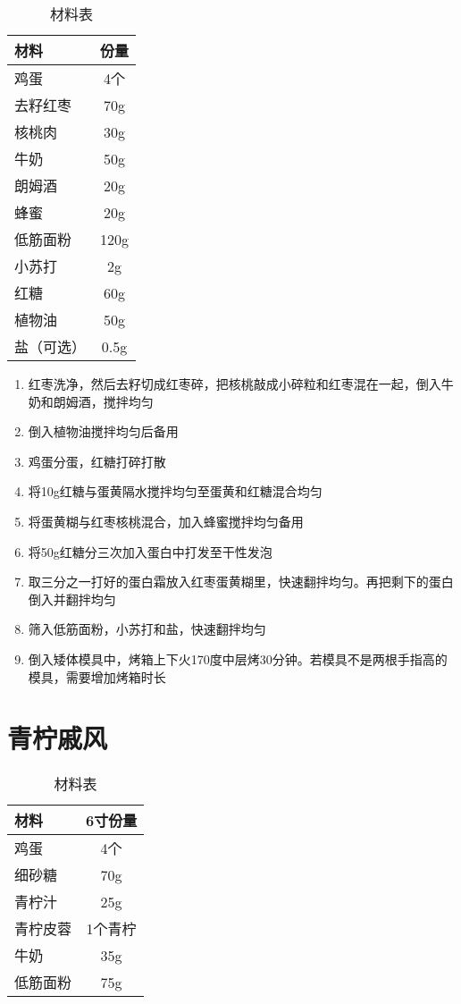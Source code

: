 \begin{table}[H]
    \centering
    \begin{tabular}{|l||c|}\hline
     \textbf{材料}    &  \textbf{份量}\\ \hline\hline
    鸡蛋 & 4个 \\ \hline
    去籽红枣 & 70g \\ \hline
    核桃肉 & 30g \\ \hline
    牛奶 & 50g \\ \hline
    朗姆酒 & 20g \\ \hline
    蜂蜜 & 20g \\ \hline
    低筋面粉 & 120g \\ \hline
    小苏打 & 2g \\ \hline
    红糖 & 60g \\ \hline
    植物油 & 50g \\ \hline
    盐（可选） & 0.5g \\ \hline
    \end{tabular}
    \caption{材料表}
\end{table}

\begin{enumerate}
    \item 红枣洗净，然后去籽切成红枣碎，把核桃敲成小碎粒和红枣混在一起，倒入牛奶和朗姆酒，搅拌均匀
    \item 倒入植物油搅拌均匀后备用
    \item 鸡蛋分蛋，红糖打碎打散
    \item 将10g红糖与蛋黄隔水搅拌均匀至蛋黄和红糖混合均匀
    \item 将蛋黄糊与红枣核桃混合，加入蜂蜜搅拌均匀备用
    \item 将50g红糖分三次加入蛋白中打发至干性发泡
    \item 取三分之一打好的蛋白霜放入红枣蛋黄糊里，快速翻拌均匀。再把剩下的蛋白倒入并翻拌均匀
    \item 筛入低筋面粉，小苏打和盐，快速翻拌均匀
    \item 倒入矮体模具中，烤箱上下火170度中层烤30分钟。若模具不是两根手指高的模具，需要增加烤箱时长
\end{enumerate}


\section{青柠戚风}

\begin{table}[H]
    \centering
    \begin{tabular}{|l||c|}\hline
     \textbf{材料}    &  \textbf{6寸份量}\\ \hline\hline
    鸡蛋 & 4个 \\ \hline
    细砂糖 & 70g \\ \hline
    青柠汁  & 25g \\ \hline
    青柠皮蓉 & 1个青柠 \\ \hline
    牛奶  & 35g \\ \hline
    低筋面粉  & 75g \\ \hline
    \end{tabular}
    \caption{材料表}
\end{table}

